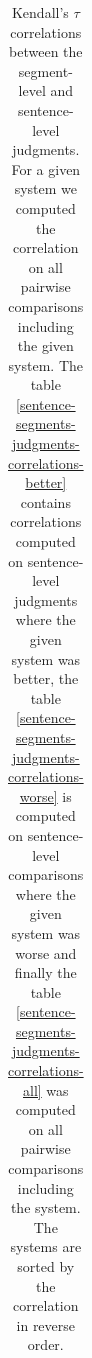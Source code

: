 \begin{table}
\begin{center}
{\begin{tabular}{|l|c|}
          \hline
        \end{tabular}
      \label{sentence-segments-judgments-correlations-worse}
    }
    \,

  \end{center}

  \caption[Correlations between the segment-level judgments and sentence-level
  judgments]{Kendall's $\tau$ correlations between the segment-level and
    sentence-level judgments. For a given system we computed the correlation on
    all pairwise comparisons including the given system. The table
    \ref{sentence-segments-judgments-correlations-better} contains correlations
    computed on sentence-level judgments where the given system was better, the
    table \ref{sentence-segments-judgments-correlations-worse} is computed on
    sentence-level comparisons where the given system was worse and finally the
    table \ref{sentence-segments-judgments-correlations-all} was computed on
    all pairwise comparisons including the system. The systems are sorted by
    the correlation in reverse order.} 

  \label{sentence-segments-judgments-correlations}
\end{table}

